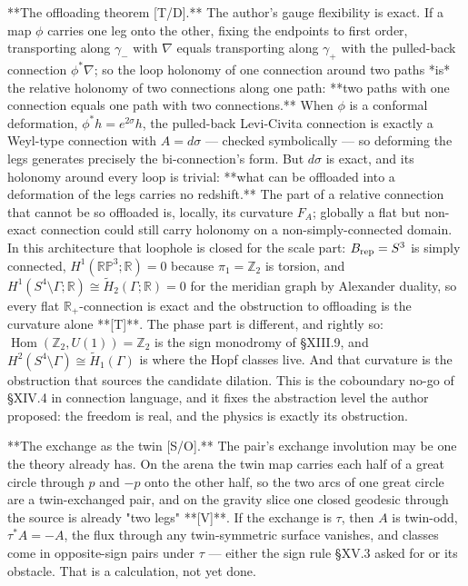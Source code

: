 **The offloading theorem [T/D].** The author's gauge flexibility is exact. If a map $\phi$ carries one leg onto the other, fixing the endpoints to first order, transporting along $\gamma_-$ with $\nabla$ equals transporting along $\gamma_+$ with the pulled-back connection $\phi^*\nabla$; so the loop holonomy of one connection around two paths *is* the relative holonomy of two connections along one path: **two paths with one connection equals one path with two connections.** When $\phi$ is a conformal deformation, $\phi^*h = e^{2\sigma}h$, the pulled-back Levi-Civita connection is exactly a Weyl-type connection with $A = d\sigma$ — checked symbolically — so deforming the legs generates precisely the bi-connection's form. But $d\sigma$ is exact, and its holonomy around every loop is trivial: **what can be offloaded into a deformation of the legs carries no redshift.** The part of a relative connection that cannot be so offloaded is, locally, its curvature $F_A$; globally a flat but non-exact connection could still carry holonomy on a non-simply-connected domain. In this architecture that loophole is closed for the scale part: $B_{\rm rep} = S^3$ is simply connected, $H^1(\mathbb{RP}^3;\mathbb R) = 0$ because $\pi_1 = \mathbb Z_2$ is torsion, and $H^1(S^4\setminus\Gamma;\mathbb R)\cong\widetilde H_2(\Gamma;\mathbb R) = 0$ for the meridian graph by Alexander duality, so every flat $\mathbb R_+$-connection is exact and the obstruction to offloading is the curvature alone **[T]**. The phase part is different, and rightly so: $\operatorname{Hom}(\mathbb Z_2,U(1)) = \mathbb Z_2$ is the sign monodromy of §XIII.9, and $H^2(S^4\setminus\Gamma)\cong\widetilde H_1(\Gamma)$ is where the Hopf classes live. And that curvature is the obstruction that sources the candidate dilation. This is the coboundary no-go of §XIV.4 in connection language, and it fixes the abstraction level the author proposed: the freedom is real, and the physics is exactly its obstruction.

**The exchange as the twin [S/O].** The pair's exchange involution may be one the theory already has. On the arena the twin map carries each half of a great circle through $p$ and $-p$ onto the other half, so the two arcs of one great circle are a twin-exchanged pair, and on the gravity slice one closed geodesic through the source is already "two legs" **[V]**. If the exchange is $\tau$, then $A$ is twin-odd, $\tau^*A = -A$, the flux through any twin-symmetric surface vanishes, and classes come in opposite-sign pairs under $\tau$ — either the sign rule §XV.3 asked for or its obstacle. That is a calculation, not yet done.

